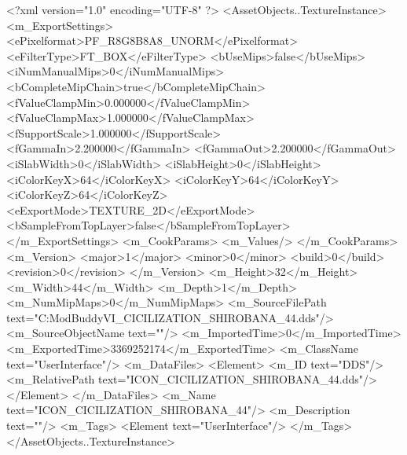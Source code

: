 <?xml version="1.0" encoding="UTF-8" ?>
<AssetObjects..TextureInstance>
	<m_ExportSettings>
		<ePixelformat>PF_R8G8B8A8_UNORM</ePixelformat>
		<eFilterType>FT_BOX</eFilterType>
		<bUseMips>false</bUseMips>
		<iNumManualMips>0</iNumManualMips>
		<bCompleteMipChain>true</bCompleteMipChain>
		<fValueClampMin>0.000000</fValueClampMin>
		<fValueClampMax>1.000000</fValueClampMax>
		<fSupportScale>1.000000</fSupportScale>
		<fGammaIn>2.200000</fGammaIn>
		<fGammaOut>2.200000</fGammaOut>
		<iSlabWidth>0</iSlabWidth>
		<iSlabHeight>0</iSlabHeight>
		<iColorKeyX>64</iColorKeyX>
		<iColorKeyY>64</iColorKeyY>
		<iColorKeyZ>64</iColorKeyZ>
		<eExportMode>TEXTURE_2D</eExportMode>
		<bSampleFromTopLayer>false</bSampleFromTopLayer>
	</m_ExportSettings>
	<m_CookParams>
		<m_Values/>
	</m_CookParams>
	<m_Version>
		<major>1</major>
		<minor>0</minor>
		<build>0</build>
		<revision>0</revision>
	</m_Version>
	<m_Height>32</m_Height>
	<m_Width>44</m_Width>
	<m_Depth>1</m_Depth>
	<m_NumMipMaps>0</m_NumMipMaps>
	<m_SourceFilePath text="C:\Users\asus\Documents\Firaxis ModBuddy\Civilization VI\temppic\ICON_CICILIZATION_SHIROBANA_44.dds"/>
	<m_SourceObjectName text=""/>
	<m_ImportedTime>0</m_ImportedTime>
	<m_ExportedTime>3369252174</m_ExportedTime>
	<m_ClassName text="UserInterface"/>
	<m_DataFiles>
		<Element>
			<m_ID text="DDS"/>
			<m_RelativePath text="ICON_CICILIZATION_SHIROBANA_44.dds"/>
		</Element>
	</m_DataFiles>
	<m_Name text="ICON_CICILIZATION_SHIROBANA_44"/>
	<m_Description text=""/>
	<m_Tags>
		<Element text="UserInterface"/>
	</m_Tags>
</AssetObjects..TextureInstance>

